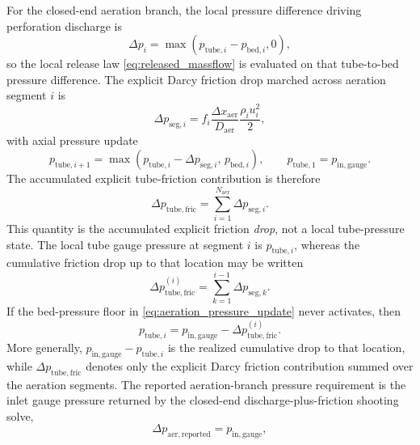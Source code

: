 \documentclass[11pt]{article}
\begin{document}
For the closed-end aeration branch, the local pressure difference driving perforation discharge is
\begin{equation}
\label{eq:aeration_local_dp}
\Delta p_i=\max\!\left(p_{\mathrm{tube},i}-p_{\mathrm{bed},i},0\right),
\end{equation}
so the local release law \eqref{eq:released_massflow} is evaluated on that tube-to-bed pressure difference. The explicit Darcy friction drop marched across aeration segment \(i\) is
\begin{equation}
\label{eq:aeration_segment_dp_exact}
\Delta p_{\mathrm{seg},i}=f_i\frac{\Delta x_{\mathrm{aer}}}{D_{\mathrm{aer}}}\frac{\rho_i u_i^2}{2},
\end{equation}
with axial pressure update
\begin{equation}
\label{eq:aeration_pressure_update}
p_{\mathrm{tube},i+1}=\max\!\left(p_{\mathrm{tube},i}-\Delta p_{\mathrm{seg},i},\,p_{\mathrm{bed},i}\right),
\qquad
p_{\mathrm{tube},1}=p_{\mathrm{in,gauge}}.
\end{equation}
The accumulated explicit tube-friction contribution is therefore
\begin{equation}
\label{eq:aeration_tube_friction_total}
\Delta p_{\mathrm{tube,fric}}=\sum_{i=1}^{N_{\mathrm{aer}}}\Delta p_{\mathrm{seg},i}.
\end{equation}
This quantity is the accumulated explicit friction \emph{drop}, not a local tube-pressure state. The local tube gauge pressure at segment \(i\) is \(p_{\mathrm{tube},i}\), whereas the cumulative friction drop up to that location may be written
\begin{equation}
\Delta p_{\mathrm{tube,fric}}^{(i)}=\sum_{k=1}^{i-1}\Delta p_{\mathrm{seg},k}.
\end{equation}
If the bed-pressure floor in \eqref{eq:aeration_pressure_update} never activates, then
\begin{equation}
p_{\mathrm{tube},i}=p_{\mathrm{in,gauge}}-\Delta p_{\mathrm{tube,fric}}^{(i)}.
\end{equation}
More generally, \(p_{\mathrm{in,gauge}}-p_{\mathrm{tube},i}\) is the realized cumulative drop to that location, while \(\Delta p_{\mathrm{tube,fric}}\) denotes only the explicit Darcy friction contribution summed over the aeration segments.
The reported aeration-branch pressure requirement is the inlet gauge pressure returned by the closed-end discharge-plus-friction shooting solve,
\begin{equation}
\label{eq:aeration_reported_dp}
\Delta p_{\mathrm{aer,reported}}=p_{\mathrm{in,gauge}},
\end{equation}
\end{document}
